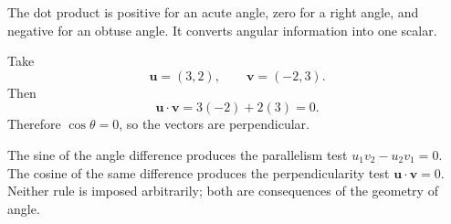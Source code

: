 \begin{interpretationbox}
The dot product is positive for an acute angle, zero for a right angle, and
negative for an obtuse angle. It converts angular information into one scalar.
\end{interpretationbox}

\begin{examplebox}
Take
\[
\mathbf u=(3,2),
\qquad
\mathbf v=(-2,3).
\]
Then
\[
\mathbf u\cdot\mathbf v=3(-2)+2(3)=0.
\]
Therefore $\cos\theta=0$, so the vectors are perpendicular.
\end{examplebox}

\begin{summarybox}
The sine of the angle difference produces the parallelism test
$u_1v_2-u_2v_1=0$. The cosine of the same difference produces the
perpendicularity test $\mathbf u\cdot\mathbf v=0$. Neither rule is imposed
arbitrarily; both are consequences of the geometry of angle.
\end{summarybox}

